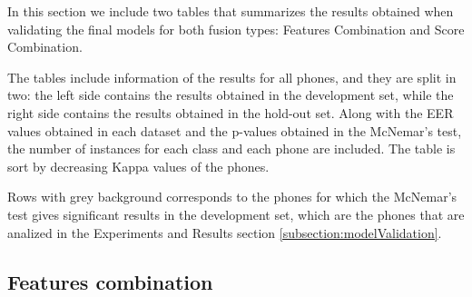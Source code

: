 In this section we include two tables that summarizes the results obtained when validating
the final models for both fusion types: Features Combination and Score Combination.

The tables include information of the results
for all phones, and they are split in two: the left side
contains the results obtained in the development set, while the right side contains
the results obtained in the hold-out set. Along with the EER values obtained in each
dataset and the p-values obtained in the McNemar's test,
the number of instances
for each class and each phone are included.
The table is sort by decreasing Kappa values of the phones.

Rows with grey background corresponds to the phones for which
the McNemar's test gives significant results in the development set, which are the
phones that are analized in the Experiments and Results section \ref{subsection:modelValidation}.

\subsection{Features combination}

